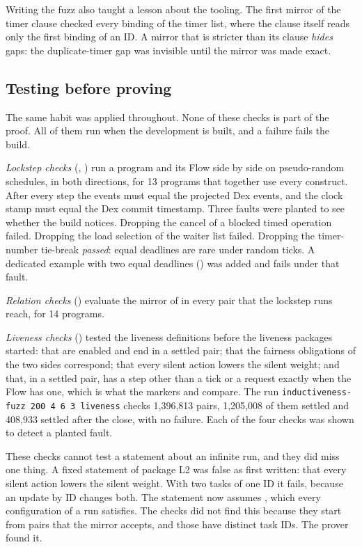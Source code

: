 Writing the fuzz also taught a lesson about the tooling. The first mirror
of the timer clause checked every binding of the timer list, where the
clause itself reads only the first binding of an ID. A mirror that is
stricter than its clause \emph{hides} gaps: the duplicate-timer gap was
invisible until the mirror was made exact.

\subsection{Testing before proving}
\label{sec:testing}

The same habit was applied throughout. None of these checks is part of the
proof. All of them run when the development is built, and a failure fails
the build.

\emph{Lockstep checks} (,
) run a program and its Flow side by
side on pseudo-random schedules, in both directions, for 13 programs that
together use every construct. After every step the \Lang{} events must
equal the projected Dex events, and the \Lang{} clock stamp must equal the
Dex commit timestamp. Three faults were planted to see whether the build
notices. Dropping the cancel of a blocked timed operation failed. Dropping
the load selection of the waiter list failed. Dropping the timer-number
tie-break \emph{passed}: equal deadlines are rare under random ticks. A
dedicated example with two equal deadlines ()
was added and fails under that fault.

\emph{Relation checks} () evaluate the
mirror of  in every pair that the lockstep runs
reach, for 14 programs.

\emph{Liveness checks} () tested the
liveness definitions before the liveness packages started: that
 are enabled and end in a settled pair; that the fairness
obligations of the two sides correspond; that every silent action lowers
the silent weight; and that, in a settled pair, \Lang{} has a step other
than a tick or a request exactly when the Flow has one, which is what the
markers \mterm{} and \mdead{} compare. The run
\texttt{inductiveness-fuzz 200 4 6 3 liveness} checks 1,396,813 pairs,
1,205,008 of them settled and 408,933 settled after the close, with no
failure. Each of the four checks was shown to detect a planted fault.

These checks cannot test a statement about an infinite run, and they did
miss one thing. A fixed statement of package L2 was false as first written:
that every silent action lowers the silent weight. With two tasks of one ID
it fails, because an update by ID changes both. The statement now assumes
, which every configuration of a run satisfies. The
checks did not find this because they start from pairs that the mirror
accepts, and those have distinct task IDs. The prover found it.

